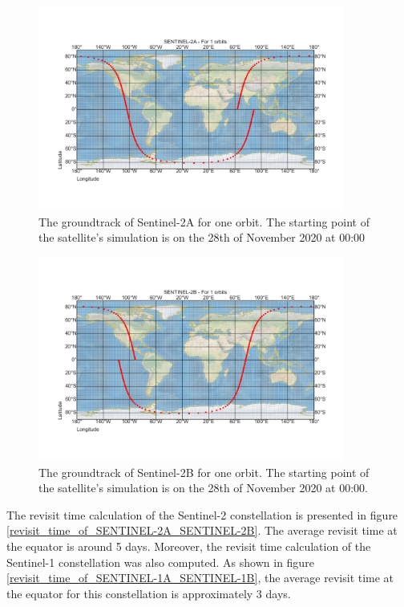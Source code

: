 \begin{figure}
\centering
\includegraphics[width=0.9\textwidth]{Images/groundtrack_Sentinel-2A.png}
\caption{The groundtrack of Sentinel-2A for one orbit. The starting point of the satellite's simulation is on the 28th of November 2020 at 00:00}
\label{groundtrack_Sentinel-2A}
\end{figure}

\begin{figure}
\centering
\includegraphics[width=0.9\textwidth]{Images/groundtrack_Sentinel-2B.png}
\caption{The groundtrack of Sentinel-2B for one orbit. The starting point of the satellite's simulation is on the 28th of November 2020 at 00:00.}
\label{groundtrack_Sentinel-2B}
\end{figure}


\bigskip
The revisit time calculation of the Sentinel-2 constellation is presented in figure \ref{revisit_time_of_SENTINEL-2A_SENTINEL-2B}. The average revisit time at the equator is around 5 days. Moreover, the revisit time calculation of the Sentinel-1 constellation was also computed. As shown in figure \ref{revisit_time_of_SENTINEL-1A_SENTINEL-1B}, the average revisit time at the equator for this constellation is approximately 3 days.

